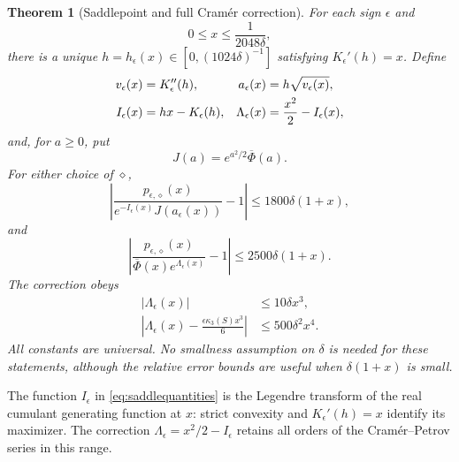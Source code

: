 \documentclass[11pt]{article}
\numberwithin{equation}{section}
\newtheorem{theorem}{Theorem}[section]
\theoremstyle{remark}
\newcommand{\Phibar}{\overline\Phi}
\begin{document}
\begin{theorem}[Saddlepoint and full Cram\'er correction]\label{thm:tails}
For each sign $\epsilon$ and
\begin{equation}\label{eq:mainrange}
 0\le x\le\frac1{2048\delta},
\end{equation}
there is a unique $h=h_\epsilon(x)\in[0,(1024\delta)^{-1}]$ satisfying
$K_\epsilon'(h)=x$. Define
\begin{align}
 v_\epsilon(x)&=K_\epsilon''(h),&
 a_\epsilon(x)&=h\sqrt{v_\epsilon(x)},\notag\\
 I_\epsilon(x)&=hx-K_\epsilon(h),&
 \Lambda_\epsilon(x)&=\frac{x^2}{2}-I_\epsilon(x),
 \label{eq:saddlequantities}
\end{align}
and, for $a\ge0$, put
\begin{equation}\label{eq:Jdef}
 J(a)=e^{a^2/2}\Phibar(a).
\end{equation}
For either choice of $\diamond$,
\begin{equation}\label{eq:saddlebound}
 \left|\frac{p_{\epsilon,\diamond}(x)}
 {e^{-I_\epsilon(x)}J(a_\epsilon(x))}-1\right|
 \le1800\delta(1+x),
\end{equation}
and
\begin{equation}\label{eq:fullcorrection}
 \left|\frac{p_{\epsilon,\diamond}(x)}
 {\Phibar(x)e^{\Lambda_\epsilon(x)}}-1\right|
 \le2500\delta(1+x).
\end{equation}
The correction obeys
\begin{align}
 |\Lambda_\epsilon(x)|&\le10\delta x^3,
 \label{eq:Lambdabound}\\
 \left|\Lambda_\epsilon(x)
       -\frac{\epsilon\kappa_3(S)x^3}{6}\right|
 &\le500\delta^2x^4.
 \label{eq:cubicLambda}
\end{align}
All constants are universal. No smallness assumption on $\delta$ is needed
for these statements, although the relative error bounds are useful when
$\delta(1+x)$ is small.
\end{theorem}

The function $I_\epsilon$ in \eqref{eq:saddlequantities} is the Legendre
transform of the real cumulant generating function at $x$: strict convexity
and $K_\epsilon'(h)=x$ identify its maximizer. The correction
$\Lambda_\epsilon=x^2/2-I_\epsilon$ retains all orders of the Cram\'er--Petrov
series in this range.
\end{document}
